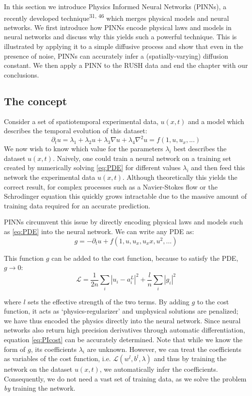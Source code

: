 \documentclass{Dissertate}
\begin{document}
In this section we introduce Physics Informed Neural Networks (PINNs), a
recently developed technique\textsuperscript{31, 46}
which merges physical models and neural networks. We first introduce how
PINNs encode physical laws and models in neural networks and discuss why
this yields such a powerful technique. This is illustrated by applying
it to a simple diffusive process and show that even in the presence of
noise, PINNs can accurately infer a (spatially-varying) diffusion
constant. We then apply a PINN to the RUSH data and end the chapter with
our conclusions.

\hypertarget{the-concept-1}{%
\subsection{The concept}\label{the-concept-1}}

Consider a set of spatiotemporal experimental data, \(u(x,t)\) and a
model which describes the temporal evolution of this dataset:
\begin{equation}
\partial_t u = \lambda_1 + \lambda_2 u + \lambda_3\nabla u + \lambda_4 \nabla^2 u = f(1, u, u_x, ...)
\label{eq:PDE}\end{equation} We now wish to know which value for the
parameters \(\lambda_i\) best describes the dataset \(u(x,t)\). Naively,
one could train a neural network on a training set created by
numerically solving \ref{eq:PDE} for different values
\(\lambda_{i}\) and then feed this network the experimental data
\(u(x,t)\). Although theoretically this yields the correct result, for
complex processes such as a Navier-Stokes flow or the Schrodinger
equation this quickly grows intractable due to the massive amount of
training data required for an accurate prediction.

PINNs circumvent this issue by directly encoding physical laws and
models such as \ref{eq:PDE} into the neural network. We can write
any PDE as: \begin{equation}
g = -\partial_t u + f(1, u, u_x, u_xx, u^2, ...)
\label{eq:PIcost}\end{equation}

This function \(g\) can be added to the cost function, because to satisfy
the PDE, \(g \to 0\): \[
\mathcal{L} = \frac{1}{2n}\sum_i|u_i-a^L_i|^2 + \frac{l}{n}\sum_i|g_i|^2
\]

where \(l\) sets the effective strength of the two terms. By adding
\(g\) to the cost function, it acts as `physics-regularizer' and
unphysical solutions are penalized; we have thus encoded the physics
directly into the neural network. Since neural networks also return high precision derivatives through automatic differentiation, equation \ref{eq:PIcost} can be accurately determined. Note that while we know the form of
\(g\), its coefficients \(\lambda_i\) are unknown. However, we can treat
the coefficients as variables of the cost function, i.e.
\(\mathcal{L}(w^l,b^l, \lambda)\) and thus by training the network on
the dataset \(u(x,t)\), we automatically infer the coefficients.
Consequently, we do not need a vast set of training data, as we solve the
problem \emph{by} training the network.
\end{document}
